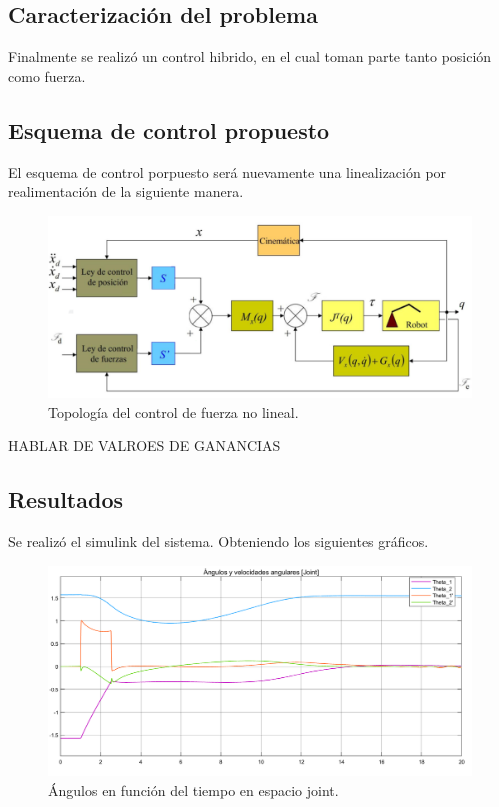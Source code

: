 %

%

\subsection{Caracterizaci\'on del problema}
Finalmente se realiz\'o un control hibrido, en el cual toman parte tanto posici\'on como fuerza.


\subsection{Esquema de control propuesto}
El esquema de control porpuesto ser\'a nuevamente una linealizaci\'on por realimentaci\'on de la siguiente manera.
\begin{figure}[H]
	\centering
	\includegraphics[width=0.8\linewidth]{ImagenesControl híbrido no lineal/controlh}
	\caption{Topolog\'ia del control de fuerza no lineal.}	
	\label{fig:control_f_modelo}
\end{figure}


HABLAR DE VALROES DE GANANCIAS
\subsection{Resultados}
Se realiz\'o el simulink del sistema. Obteniendo los siguientes gr\'aficos.

\begin{figure}[H]
	\centering
	\includegraphics[width=0.8\linewidth]{ImagenesControl híbrido no lineal/3_3_a}
	\caption{\'Angulos en funci\'on del tiempo en espacio joint.}	
	\label{fig:cthetas}
\end{figure}

